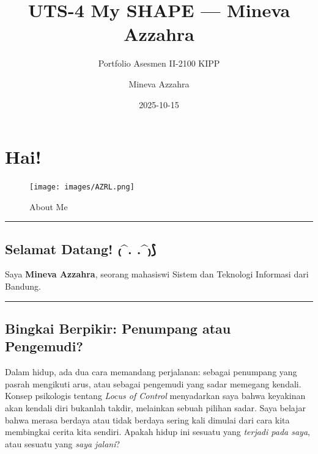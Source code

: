 \documentclass[
  letterpaper,
  DIV=11,
  numbers=noendperiod]{scrreprt}
\title{UTS-4 My SHAPE --- Mineva Azzahra}
\subtitle{Portfolio Asesmen II-2100 KIPP}
\author{Mineva Azzahra}
\date{2025-10-15}
\renewcommand*\contentsname{Table of contents}
\newcommand\contentsname{Table of contents}
\begin{document}
\maketitle

\renewcommand*\contentsname{Table of contents}
{
\hypersetup{linkcolor=}
\setcounter{tocdepth}{2}
\tableofcontents
}


\chapter*{Hai!}\label{hai}


\begin{figure}[H]

{\centering \texttt{[image: images/AZRL.png]}

}

\caption{About Me}

\end{figure}%

\begin{center}\rule{0.5\linewidth}{0.5pt}\end{center}

\section*{Selamat Datang! ₍\^{}. .\^{}₎⟆}\label{selamat-datang-.-.}


Saya \textbf{Mineva Azzahra}, seorang mahasiswi Sistem dan Teknologi
Informasi dari Bandung.

\begin{center}\rule{0.5\linewidth}{0.5pt}\end{center}

\section*{Bingkai Berpikir: Penumpang atau
Pengemudi?}\label{bingkai-berpikir-penumpang-atau-pengemudi}


Dalam hidup, ada dua cara memandang perjalanan: sebagai penumpang yang
pasrah mengikuti arus, atau sebagai pengemudi yang sadar memegang
kendali. Konsep psikologis tentang \emph{Locus of Control} menyadarkan
saya bahwa keyakinan akan kendali diri bukanlah takdir, melainkan sebuah
pilihan sadar. Saya belajar bahwa merasa berdaya atau tidak berdaya
sering kali dimulai dari cara kita membingkai cerita kita sendiri.
Apakah hidup ini sesuatu yang \emph{terjadi pada saya}, atau sesuatu
yang \emph{saya jalani}?
\end{document}
